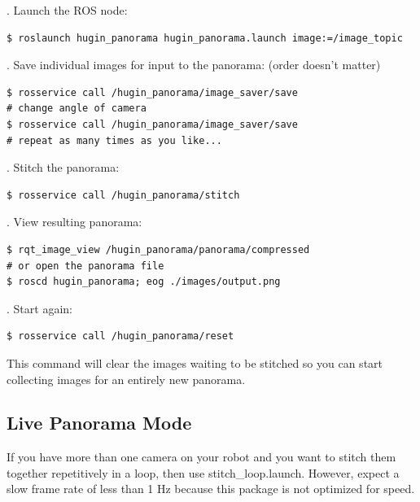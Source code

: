 \documentclass[runningheads,a4paper]{llncs}
\begin{document}
. Launch the ROS node:

\begin{lstlisting}[frame=single,basicstyle=\ttfamily\footnotesize,breaklines=true]
$ roslaunch hugin_panorama hugin_panorama.launch image:=/image_topic
\end{lstlisting}

. Save individual images for input to the panorama: (order doesn't matter)

\begin{lstlisting}[frame=single,basicstyle=\ttfamily\footnotesize,breaklines=true]
$ rosservice call /hugin_panorama/image_saver/save
# change angle of camera
$ rosservice call /hugin_panorama/image_saver/save
# repeat as many times as you like...
\end{lstlisting}

. Stitch the panorama:

\begin{lstlisting}[frame=single,basicstyle=\ttfamily\footnotesize,breaklines=true]
$ rosservice call /hugin_panorama/stitch
\end{lstlisting}

. View resulting panorama:

\begin{lstlisting}[frame=single,basicstyle=\ttfamily\footnotesize,breaklines=true]
$ rqt_image_view /hugin_panorama/panorama/compressed
# or open the panorama file
$ roscd hugin_panorama; eog ./images/output.png
\end{lstlisting}

. Start again:

\begin{lstlisting}[frame=single,basicstyle=\ttfamily\footnotesize,breaklines=true]
$ rosservice call /hugin_panorama/reset
\end{lstlisting}

This command will clear the images waiting to be stitched so you can start collecting images for an entirely new panorama.


\subsection{Live Panorama Mode}

If you have more than one camera on your robot and you want to stitch them together repetitively in a loop, then use stitch\_loop.launch. However, expect a slow frame rate of less than 1 Hz because this package is not optimized for speed.
\end{document}
